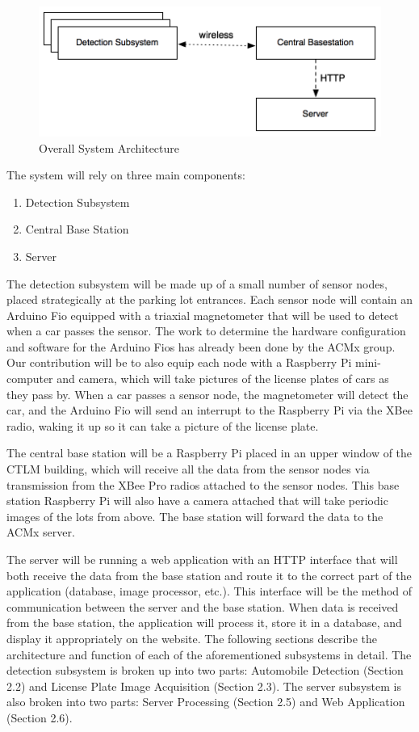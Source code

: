 \documentclass[11pt, oneside, fullpage, doublespace]{article}
\begin{document}
\begin{figure}
\begin{center}
\includegraphics[width=4.5in]{architecture}
\end{center}
\caption{Overall System Architecture}
\label{fig:system}
\end{figure}

The system will rely on three main components:
\begin{enumerate}
\item Detection Subsystem
\item Central Base Station
\item Server
\end{enumerate}
The detection subsystem will be made up of a small number of sensor nodes, placed strategically at the parking lot entrances. Each sensor node will contain an Arduino Fio equipped with a triaxial magnetometer that will be used to detect when a car passes the sensor. The work to determine the hardware configuration and software for the Arduino Fios has already been done by the ACMx group. Our contribution will be to also equip each node with a Raspberry Pi mini-computer and camera, which will take pictures of the license plates of cars as they pass by. When a car passes a sensor node, the magnetometer will detect the car, and the Arduino Fio will send an interrupt to the Raspberry Pi via the XBee radio, waking it up so it can take a picture of the license plate.

The central base station will be a Raspberry Pi placed in an upper window of the CTLM building, which will receive all the data from the sensor nodes via transmission from the XBee Pro radios attached to the sensor nodes. This base station Raspberry Pi will also have a camera attached that will take periodic images of the lots from above. The base station will forward the data to the ACMx server.

The server will be running a web application with an HTTP interface that will both receive the data from the base station and route it to the correct part of the application (database, image processor, etc.). This interface will be the method of communication between the server and the base station. When data is received from the base station, the application will process it, store it in a database, and display it appropriately on the website. The following sections describe the architecture and function of each of the aforementioned subsystems in detail. The detection subsystem is broken up into two parts: Automobile Detection (Section 2.2) and License Plate Image Acquisition (Section 2.3). The server subsystem is also broken into two parts: Server Processing (Section 2.5) and Web Application (Section 2.6).
\end{document}
